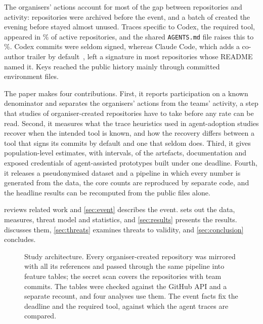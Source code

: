 \documentclass{article}
\begin{document}
The organisers' actions account for most of the gap between repositories and activity: \NRqOnePrearchivedN{} repositories were archived before the event, and a batch of \NRqOneBatchN{} created the evening before stayed almost unused. Traces specific to Codex, the required tool, appeared in \NRqTwoTracesCodexSpecificPct\% of active repositories, and the shared \texttt{AGENTS.md} file raises this to \NRqTwoTracesCodexAnyPct\%. Codex commits were seldom signed, whereas Claude Code, which adds a co-author trailer by default~\cite{claudecode2026attribution}, left a signature in most repositories whose README named it. Keys reached the public history mainly through committed environment files.

The paper makes four contributions. First, it reports participation on a known denominator and separates the organisers' actions from the teams' activity, a step that studies of organiser-created repositories have to take before any rate can be read. Second, it measures what the trace heuristics used in agent-adoption studies recover when the intended tool is known, and how the recovery differs between a tool that signs its commits by default and one that seldom does. Third, it gives population-level estimates, with intervals, of the artefacts, documentation and exposed credentials of agent-assisted prototypes built under one deadline. Fourth, it releases a pseudonymised dataset and a pipeline in which every number is generated from the data, the core counts are reproduced by separate code, and the headline results can be recomputed from the public files alone.

 reviews related work and \cref{sec:event} describes the event.  sets out the data, measures, threat model and statistics, and \cref{sec:results} presents the results.  discusses them, \cref{sec:threats} examines threats to validity, and \cref{sec:conclusion} concludes.

\begin{figure}[t]
  \centering
  
  \caption{Study architecture. Every organiser-created repository was mirrored with all its references and passed through the same pipeline into feature tables; the secret scan covers the repositories with team commits. The tables were checked against the GitHub API and a separate recount, and four analyses use them. The event facts fix the deadline and the required tool, against which the agent traces are compared.}
  \label{fig:overview}
\end{figure}
\end{document}
